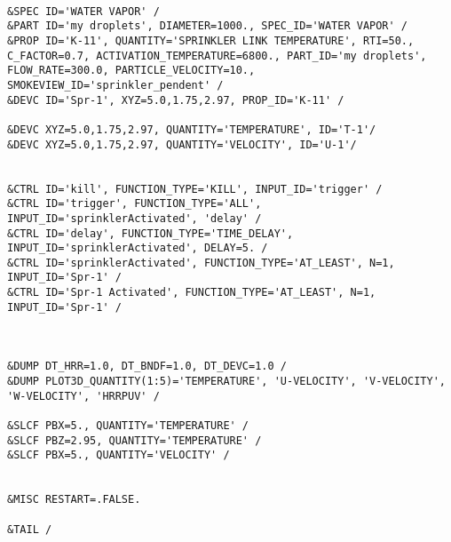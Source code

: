 \begin{lstlisting}[emptylines=0,basicstyle=\tiny]
 
&SPEC ID='WATER VAPOR' /
&PART ID='my droplets', DIAMETER=1000., SPEC_ID='WATER VAPOR' /
&PROP ID='K-11', QUANTITY='SPRINKLER LINK TEMPERATURE', RTI=50., C_FACTOR=0.7, ACTIVATION_TEMPERATURE=6800., PART_ID='my droplets', FLOW_RATE=300.0, PARTICLE_VELOCITY=10., SMOKEVIEW_ID='sprinkler_pendent' /
&DEVC ID='Spr-1', XYZ=5.0,1.75,2.97, PROP_ID='K-11' /

&DEVC XYZ=5.0,1.75,2.97, QUANTITY='TEMPERATURE', ID='T-1'/
&DEVC XYZ=5.0,1.75,2.97, QUANTITY='VELOCITY', ID='U-1'/


&CTRL ID='kill', FUNCTION_TYPE='KILL', INPUT_ID='trigger' /
&CTRL ID='trigger', FUNCTION_TYPE='ALL', INPUT_ID='sprinklerActivated', 'delay' /
&CTRL ID='delay', FUNCTION_TYPE='TIME_DELAY', INPUT_ID='sprinklerActivated', DELAY=5. /
&CTRL ID='sprinklerActivated', FUNCTION_TYPE='AT_LEAST', N=1, INPUT_ID='Spr-1' /
&CTRL ID='Spr-1 Activated', FUNCTION_TYPE='AT_LEAST', N=1, INPUT_ID='Spr-1' /



&DUMP DT_HRR=1.0, DT_BNDF=1.0, DT_DEVC=1.0 /
&DUMP PLOT3D_QUANTITY(1:5)='TEMPERATURE', 'U-VELOCITY', 'V-VELOCITY', 'W-VELOCITY', 'HRRPUV' /

&SLCF PBX=5., QUANTITY='TEMPERATURE' /
&SLCF PBZ=2.95, QUANTITY='TEMPERATURE' /
&SLCF PBX=5., QUANTITY='VELOCITY' /


&MISC RESTART=.FALSE.

&TAIL /


\end{lstlisting}

